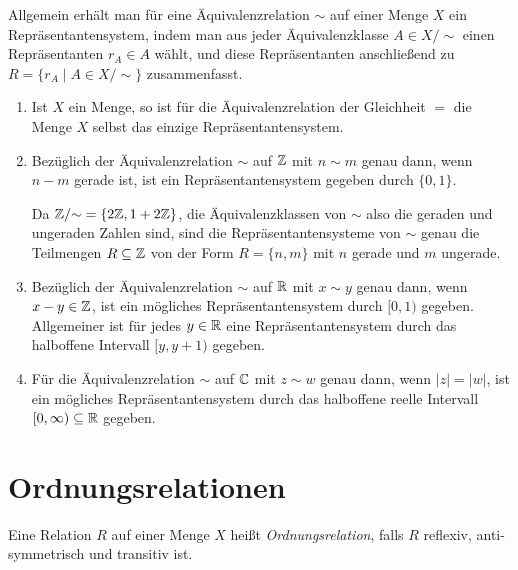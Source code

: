 \begin{bem}
 Allgemein erhält man für eine Äquivalenzrelation $\sim$ auf einer Menge $X$ ein Repräsentantensystem, indem man aus jeder Äquivalenzklasse $A \in X/{\sim}$ einen Repräsentanten $r_A \in A$ wählt, und diese Repräsentanten anschließend zu $R = \{r_A \mid A \in X/{\sim}\}$ zusammenfasst.
\end{bem}


\begin{bsp}
 \begin{enumerate}[leftmargin=*]
  \item
   Ist $X$ ein Menge, so ist für die Äquivalenzrelation der Gleichheit $=$ die Menge $X$ selbst das einzige Repräsentantensystem.
  \item
   Bezüglich der Äquivalenzrelation $\sim$ auf $\mathbb{Z}$ mit $n \sim m$ genau dann, wenn $n-m$ gerade ist, ist ein Repräsentantensystem gegeben durch $\{0,1\}$.
   
   Da $\mathbb{Z}/{\sim} = \{2\mathbb{Z}, 1+2\mathbb{Z}\}$, die Äquivalenzklassen von $\sim$ also die geraden und ungeraden Zahlen sind, sind die Repräsentantensysteme von $\sim$ genau die Teilmengen $R \subseteq \mathbb{Z}$ von der Form $R = \{n,m\}$ mit $n$ gerade und $m$ ungerade.
  \item
   Bezüglich der Äquivalenzrelation $\sim$ auf $\mathbb{R}$ mit $x \sim y$ genau dann, wenn $x-y \in \mathbb{Z}$, ist ein mögliches Repräsentantensystem durch $[0,1)$ gegeben. Allgemeiner ist für jedes $y \in \mathbb{R}$ eine Repräsentantensystem durch das halboffene Intervall $[y,y+1)$ gegeben.
  \item
   Für die Äquivalenzrelation $\sim$ auf $\mathbb{C}$ mit $z \sim w$ genau dann, wenn $|z| = |w|$, ist ein mögliches Repräsentantensystem durch das halboffene reelle Intervall $[0,\infty) \subseteq \mathbb{R}$ gegeben.
 \end{enumerate}
\end{bsp}









\section{Ordnungsrelationen}
\begin{defi}
 Eine Relation $R$ auf einer Menge $X$ heißt \emph{Ordnungsrelation}, falls $R$ reflexiv, anti-symmetrisch und transitiv ist.
\end{defi}

